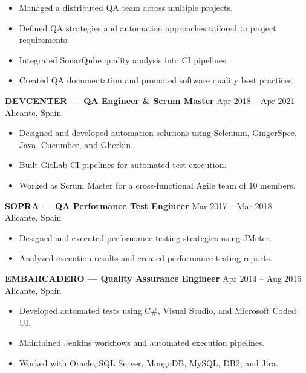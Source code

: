 \documentclass[11pt,a4paper]{article}
\begin{document}
\begin{itemize}[leftmargin=*, itemsep=0.3em]
    \item Managed a distributed QA team across multiple projects.
    \item Defined QA strategies and automation approaches tailored to project requirements.
    \item Integrated SonarQube quality analysis into CI pipelines.
    \item Created QA documentation and promoted software quality best practices.
\end{itemize}

\vspace{0.3cm}

\textbf{DEVCENTER — QA Engineer \& Scrum Master} \hfill Apr 2018 -- Apr 2021 \\
Alicante, Spain

\begin{itemize}[leftmargin=*, itemsep=0.3em]
    \item Designed and developed automation solutions using Selenium, GingerSpec, Java, Cucumber, and Gherkin.
    \item Built GitLab CI pipelines for automated test execution.
    \item Worked as Scrum Master for a cross-functional Agile team of 10 members.
\end{itemize}

\vspace{0.3cm}

\textbf{SOPRA — QA Performance Test Engineer} \hfill Mar 2017 -- Mar 2018 \\
Alicante, Spain

\begin{itemize}[leftmargin=*, itemsep=0.3em]
    \item Designed and executed performance testing strategies using JMeter.
    \item Analyzed execution results and created performance testing reports.
\end{itemize}

\vspace{0.3cm}

\textbf{EMBARCADERO — Quality Assurance Engineer} \hfill Apr 2014 -- Aug 2016 \\
Alicante, Spain

\begin{itemize}[leftmargin=*, itemsep=0.3em]
    \item Developed automated tests using C\#, Visual Studio, and Microsoft Coded UI.
    \item Maintained Jenkins workflows and automated execution pipelines.
    \item Worked with Oracle, SQL Server, MongoDB, MySQL, DB2, and Jira.
\end{itemize}
\end{document}
